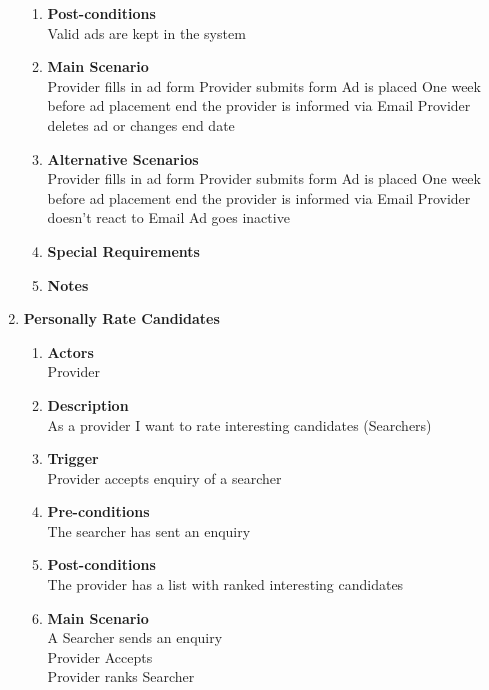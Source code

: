 \documentclass{scrreprt}
\begin{document}
\begin{enumerate}
\begin{enumerate}
		\item \textbf{Post-conditions} \\
			Valid ads are kept in the system

		\item \textbf{Main Scenario} \\
			Provider fills in ad form
			Provider submits form
			Ad is placed
			One week before ad placement end the provider is informed via Email
			Provider deletes ad or changes end date

		\item \textbf{Alternative Scenarios} \\
			Provider fills in ad form
			Provider submits form
			Ad is placed
			One week before ad placement end the provider is informed via Email
			Provider doesn’t react to Email
			Ad goes inactive
		\item \textbf{Special Requirements} \\

		\item \textbf{Notes} \\
	\end{enumerate}


	\item \textbf{Personally Rate Candidates}
	\begin{enumerate}
		\item \textbf{Actors}  \\
			Provider\\

		\item \textbf{Description} \\
			As a provider I want to rate interesting candidates (Searchers)\\
			
		\item \textbf{Trigger} \\
			Provider accepts enquiry of a searcher\\

		\item \textbf{Pre-conditions} \\
			The searcher has sent an enquiry\\

		\item \textbf{Post-conditions} \\
			The provider has a list with ranked interesting candidates\\

		\item \textbf{Main Scenario} \\
			A Searcher sends an enquiry\\
			Provider Accepts\\
			Provider ranks Searcher\\


\end{enumerate}
\end{enumerate}
\end{document}
